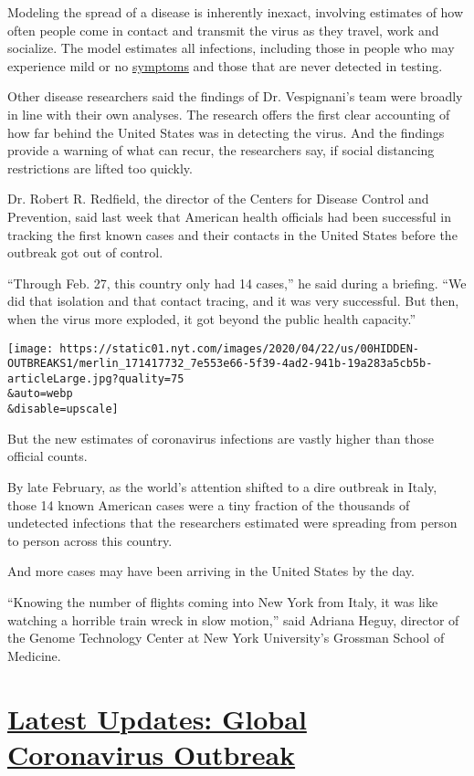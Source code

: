 Modeling the spread of a disease is inherently inexact, involving
estimates of how often people come in contact and transmit the virus as
they travel, work and socialize. The model estimates all infections,
including those in people who may experience mild or no
\href{https://www.nytimes.com/2020/04/30/well/live/coronavirus-days-5-through-10.html}{symptoms}
and those that are never detected in testing.

Other disease researchers said the findings of Dr. Vespignani's team
were broadly in line with their own analyses. The research offers the
first clear accounting of how far behind the United States was in
detecting the virus. And the findings provide a warning of what can
recur, the researchers say, if social distancing restrictions are lifted
too quickly.

Dr. Robert R. Redfield, the director of the Centers for Disease Control
and Prevention, said last week that American health officials had been
successful in tracking the first known cases and their contacts in the
United States before the outbreak got out of control.

``Through Feb. 27, this country only had 14 cases,'' he said during a
briefing. ``We did that isolation and that contact tracing, and it was
very successful. But then, when the virus more exploded, it got beyond
the public health capacity.''

\texttt{[image: https://static01.nyt.com/images/2020/04/22/us/00HIDDEN-OUTBREAKS1/merlin\_171417732\_7e553e66-5f39-4ad2-941b-19a283a5cb5b-articleLarge.jpg?quality=75\\\&auto=webp\\\&disable=upscale]}

But the new estimates of coronavirus infections are vastly higher than
those official counts.

By late February, as the world's attention shifted to a dire outbreak in
Italy, those 14 known American cases were a tiny fraction of the
thousands of undetected infections that the researchers estimated were
spreading from person to person across this country.

And more cases may have been arriving in the United States by the day.

``Knowing the number of flights coming into New York from Italy, it was
like watching a horrible train wreck in slow motion,'' said Adriana
Heguy, director of the Genome Technology Center at New York University's
Grossman School of Medicine.

\hypertarget{latest-updates-global-coronavirus-outbreak}{%
\section{\texorpdfstring{\href{https://www.nytimes.com/2020/08/01/world/coronavirus-covid-19.html?action=click\&pgtype=Article\&state=default\&region=MAIN_CONTENT_1\&context=storylines_live_updates}{Latest
Updates: Global Coronavirus
Outbreak}}{Latest Updates: Global Coronavirus Outbreak}}\label{latest-updates-global-coronavirus-outbreak}}

